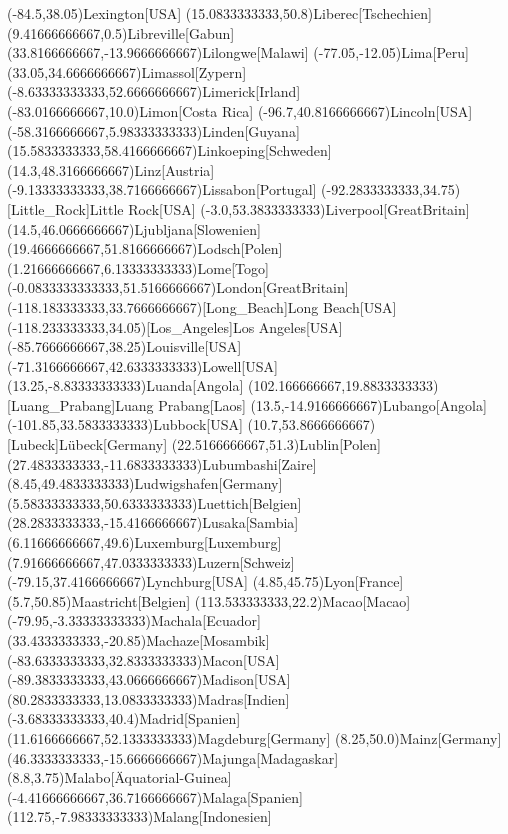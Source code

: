 \mapput(-84.5,38.05){Lexington}[USA]
\mapput(15.0833333333,50.8){Liberec}[Tschechien]
\mapput(9.41666666667,0.5){Libreville}[Gabun]
\mapput(33.8166666667,-13.9666666667){Lilongwe}[Malawi]
\mapput(-77.05,-12.05){Lima}[Peru]
\mapput(33.05,34.6666666667){Limassol}[Zypern]
\mapput(-8.63333333333,52.6666666667){Limerick}[Irland]
\mapput(-83.0166666667,10.0){Limon}[Costa Rica]
\mapput(-96.7,40.8166666667){Lincoln}[USA]
\mapput(-58.3166666667,5.98333333333){Linden}[Guyana]
\mapput(15.5833333333,58.4166666667){Linkoeping}[Schweden]
\mapput(14.3,48.3166666667){Linz}[Austria]
\mapput(-9.13333333333,38.7166666667){Lissabon}[Portugal]
\mapput(-92.2833333333,34.75)[Little_Rock]{Little Rock}[USA]
\mapput(-3.0,53.3833333333){Liverpool}[GreatBritain]
\mapput(14.5,46.0666666667){Ljubljana}[Slowenien]
\mapput(19.4666666667,51.8166666667){Lodsch}[Polen]
\mapput(1.21666666667,6.13333333333){Lome}[Togo]
\mapput(-0.0833333333333,51.5166666667){London}[GreatBritain]
\mapput(-118.183333333,33.7666666667)[Long_Beach]{Long Beach}[USA]
\mapput(-118.233333333,34.05)[Los_Angeles]{Los Angeles}[USA]
\mapput(-85.7666666667,38.25){Louisville}[USA]
\mapput(-71.3166666667,42.6333333333){Lowell}[USA]
\mapput(13.25,-8.83333333333){Luanda}[Angola]
\mapput(102.166666667,19.8833333333)[Luang_Prabang]{Luang Prabang}[Laos]
\mapput(13.5,-14.9166666667){Lubango}[Angola]
\mapput(-101.85,33.5833333333){Lubbock}[USA]
\mapput(10.7,53.8666666667)[Lubeck]{Lübeck}[Germany]
\mapput(22.5166666667,51.3){Lublin}[Polen]
\mapput(27.4833333333,-11.6833333333){Lubumbashi}[Zaire]
\mapput(8.45,49.4833333333){Ludwigshafen}[Germany]
\mapput(5.58333333333,50.6333333333){Luettich}[Belgien]
\mapput(28.2833333333,-15.4166666667){Lusaka}[Sambia]
\mapput(6.11666666667,49.6){Luxemburg}[Luxemburg]
\mapput(7.91666666667,47.0333333333){Luzern}[Schweiz]
\mapput(-79.15,37.4166666667){Lynchburg}[USA]
\mapput(4.85,45.75){Lyon}[France]
\mapput(5.7,50.85){Maastricht}[Belgien]
\mapput(113.533333333,22.2){Macao}[Macao]
\mapput(-79.95,-3.33333333333){Machala}[Ecuador]
\mapput(33.4333333333,-20.85){Machaze}[Mosambik]
\mapput(-83.6333333333,32.8333333333){Macon}[USA]
\mapput(-89.3833333333,43.0666666667){Madison}[USA]
\mapput(80.2833333333,13.0833333333){Madras}[Indien]
\mapput(-3.68333333333,40.4){Madrid}[Spanien]
\mapput(11.6166666667,52.1333333333){Magdeburg}[Germany]
\mapput(8.25,50.0){Mainz}[Germany]
\mapput(46.3333333333,-15.6666666667){Majunga}[Madagaskar]
\mapput(8.8,3.75){Malabo}[Äquatorial-Guinea]
\mapput(-4.41666666667,36.7166666667){Malaga}[Spanien]
\mapput(112.75,-7.98333333333){Malang}[Indonesien]
